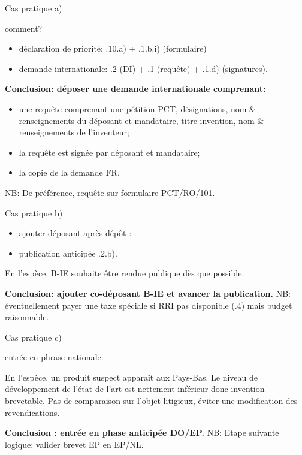 \begin{frame}{Cas pratique a)}

\begin{block}{comment?}
\begin{itemize}
    \item déclaration de priorité: .10.a) + .1.b.i) (formulaire)
    \item demande internationale: .2 (DI) + .1 (requête) + .1.d) (signatures).
\end{itemize}
\end{block}

\textbf{Conclusion: déposer une demande internationale comprenant:}
\begin{itemize}
    \item une requête comprenant une pétition PCT, désignations,
    nom \& renseignements du déposant et mandataire, titre invention,
    nom \& renseignements de l'inventeur;
    \item la requête est signée par déposant et mandataire;
    \item la copie de la demande FR.
\end{itemize}
NB: De préférence, requête sur formulaire PCT/RO/101.
\end{frame}

\begin{frame}{Cas pratique b)}

\begin{block}{}
\begin{itemize}
  \item ajouter déposant après dépôt : .
  \item publication anticipée .2.b).
\end{itemize}
\end{block}

En l'espèce, B-IE souhaite être rendue publique dès que possible.\newline

\textbf{Conclusion: ajouter co-déposant B-IE et
avancer la publication.}\newline
NB: éventuellement payer une taxe spéciale
si RRI pas disponible (.4) mais budget raisonnable.
\end{frame}

\begin{frame}{Cas pratique c)}

\begin{block}{}
entrée en phrase nationale: 
\end{block}

En l'espèce, un produit suspect apparaît aux Pays-Bas.
Le niveau de développement de l'état de l'art est
nettement inférieur donc invention brevetable.
Pas de comparaison sur l'objet litigieux, éviter
une modification des revendications.\newline

\textbf{Conclusion : entrée en phase anticipée DO/EP.}\newline
NB: Etape suivante logique: valider brevet EP en EP/NL.
\end{frame}

